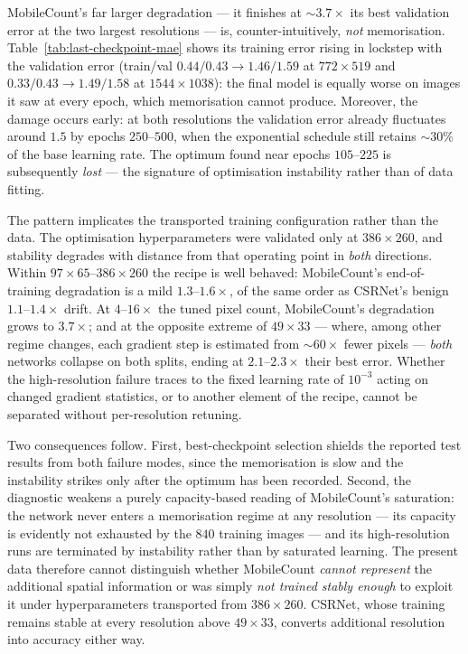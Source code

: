 \documentclass[conference]{IEEEtran}
\begin{document}
MobileCount's far larger degradation — it finishes at ${\sim}3.7\times$ its
best validation error at the two largest resolutions — is,
counter-intuitively, \emph{not} memorisation. Table~\ref{tab:last-checkpoint-mae}
shows its training error rising in lockstep with the validation error
(train/val $0.44/0.43 \rightarrow 1.46/1.59$ at $772\times519$ and
$0.33/0.43 \rightarrow 1.49/1.58$ at $1544\times1038$): the final model is
equally worse on images it saw at every epoch, which memorisation cannot
produce. Moreover, the damage occurs early: at both resolutions the validation
error already fluctuates around $1.5$ by epochs $250$--$500$, when the
exponential schedule still retains ${\sim}30\%$ of the base learning rate. The
optimum found near epochs $105$--$225$ is subsequently \emph{lost} — the
signature of optimisation instability rather than of data fitting.

The pattern implicates the transported training configuration rather than the
data. The optimisation hyperparameters were validated only at $386\times260$,
and stability degrades with distance from that operating point in \emph{both}
directions. Within $97\times65$--$386\times260$ the recipe is well behaved:
MobileCount's end-of-training degradation is a mild $1.3$--$1.6\times$, of the
same order as CSRNet's benign $1.1$--$1.4\times$ drift. At $4$--$16\times$ the
tuned pixel count, MobileCount's degradation grows to $3.7\times$; and at the
opposite extreme of $49\times33$ — where, among other regime changes, each
gradient step is estimated from ${\sim}60\times$ fewer pixels — \emph{both}
networks collapse on both splits, ending at $2.1$--$2.3\times$ their best
error. Whether the high-resolution failure traces to the fixed learning rate
of $10^{-3}$ acting on changed gradient statistics, or to another element of
the recipe, cannot be separated without per-resolution retuning.

Two consequences follow. First, best-checkpoint selection shields the reported
test results from both failure modes, since the memorisation is slow and the
instability strikes only after the optimum has been recorded. Second, the
diagnostic weakens a purely capacity-based reading of MobileCount's
saturation: the network never enters a memorisation regime at any resolution —
its capacity is evidently not exhausted by the $840$ training images — and its
high-resolution runs are terminated by instability rather than by saturated
learning. The present data therefore cannot distinguish whether MobileCount
\emph{cannot represent} the additional spatial information or was simply
\emph{not trained stably enough} to exploit it under hyperparameters
transported from $386\times260$. CSRNet, whose training remains stable at
every resolution above $49\times33$, converts additional resolution into
accuracy either way.
\end{document}
